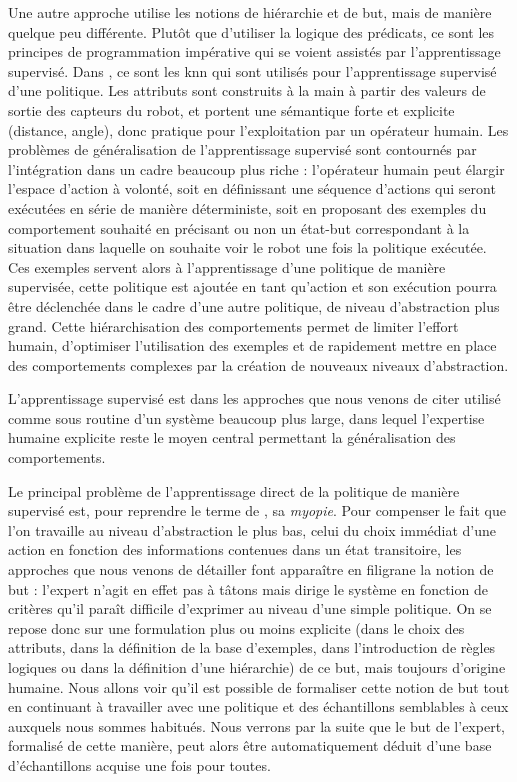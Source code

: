\documentclass[frenchb,a4paper,justified,notoc]{tufte-book}
\begin{document}
Une autre approche utilise les notions de hiérarchie et de but, mais de manière quelque peu différente. Plutôt que d'utiliser la logique des prédicats, ce sont les principes de programmation impérative qui se voient assistés par l'apprentissage supervisé. Dans \citep{saunders2006teaching}, ce sont les \gls{knn} qui sont utilisés pour l'apprentissage supervisé d'une politique. Les attributs sont construits à la main à partir des valeurs de sortie des capteurs du robot, et portent une sémantique forte et explicite (distance, angle), donc pratique pour l'exploitation par un opérateur humain. Les problèmes de généralisation de l'apprentissage supervisé sont contournés par l'intégration dans un cadre beaucoup plus riche : l'opérateur humain peut élargir l'espace d'action à volonté, soit en définissant une séquence d'actions qui seront exécutées en série de manière déterministe, soit en proposant des exemples du comportement souhaité en précisant ou non un état-but correspondant à la situation dans laquelle on souhaite voir le robot une fois la politique exécutée. Ces exemples servent alors à l'apprentissage d'une politique de manière supervisée, cette politique est ajoutée en tant qu'action et son exécution pourra être déclenchée dans le cadre d'une autre politique, de niveau d'abstraction plus grand. Cette hiérarchisation des comportements permet de limiter l'effort humain, d'optimiser l'utilisation des exemples et de rapidement mettre en place des comportements complexes par la création de nouveaux niveaux d'abstraction. 

L'apprentissage supervisé est dans les approches que nous venons de citer utilisé comme sous routine d'un système beaucoup plus large, dans lequel l'expertise humaine explicite reste le moyen central permettant la généralisation des comportements.

Le principal problème de l'apprentissage direct de la politique de manière supervisé est, pour reprendre le terme de \citep{ratliff2009learning}, sa \emph{myopie}. Pour compenser le fait que l'on travaille au niveau d'abstraction le plus bas, celui du choix immédiat d'une action en fonction des informations contenues dans un état transitoire, les approches que nous venons de détailler font apparaître en filigrane la notion de but : l'expert n'agit en effet pas à tâtons mais dirige le système en fonction de critères qu'il paraît difficile d'exprimer au niveau d'une simple politique. On se repose donc sur une formulation plus ou moins explicite (dans le choix des attributs, dans la définition de la base d'exemples, dans l'introduction de règles logiques ou dans la définition d'une hiérarchie) de ce but, mais toujours d'origine humaine. Nous allons voir qu'il est possible de formaliser cette notion de but tout en continuant à travailler avec une politique et des échantillons semblables à ceux auxquels nous sommes habitués. Nous verrons par la suite que le but de l'expert, formalisé de cette manière, peut alors être automatiquement déduit d'une base d'échantillons acquise une fois pour toutes. 
\end{document}
